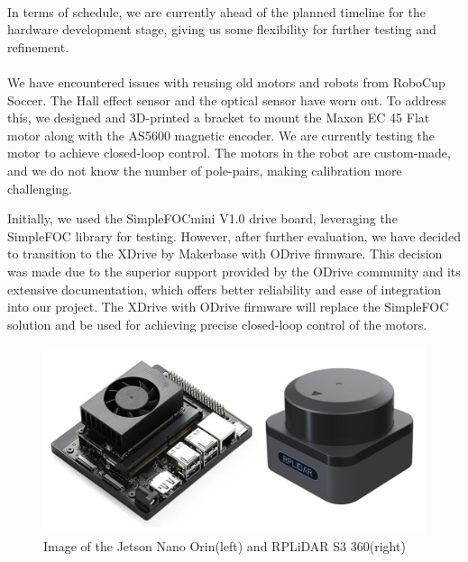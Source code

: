 \paragraph*{}
In terms of schedule, we are currently ahead of the planned timeline for the hardware development stage, giving us some flexibility for further testing and refinement.

\paragraph*{}
We have encountered issues with reusing old motors and robots from RoboCup Soccer. The Hall effect sensor and the optical sensor have worn out. To address this, we designed and 3D-printed a bracket to mount the Maxon EC 45 Flat motor along with the AS5600 magnetic encoder. We are currently testing the motor to achieve closed-loop control. The motors in the robot are custom-made, and we do not know the number of pole-pairs, making calibration more challenging. 

Initially, we used the SimpleFOCmini V1.0 drive board, leveraging the SimpleFOC library for testing. However, after further evaluation, we have decided to transition to the XDrive by Makerbase with ODrive firmware. This decision was made due to the superior support provided by the ODrive community and its extensive documentation, which offers better reliability and ease of integration into our project. The XDrive with ODrive firmware will replace the SimpleFOC solution and be used for achieving precise closed-loop control of the motors.
\begin{figure}
    \centering
    \includegraphics[width=0.5\linewidth]{assets/images/hardware/JetsonNano+RPLiDAR.png}
    \caption{Image of the Jetson Nano Orin(left) and RPLiDAR S3 360(right)}
    \label{fig:enter-label}
\end{figure}
